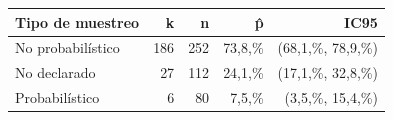 \begin{tabular}{lrrrr}
\toprule
Tipo de muestreo & k & n & p̂ & IC95\\
\midrule
No probabilístico & 186 & 252 & 73,8,\% & (68,1,\%, 78,9,\%)\\
No declarado & 27 & 112 & 24,1,\% & (17,1,\%, 32,8,\%)\\
Probabilístico & 6 & 80 & 7,5,\% & (3,5,\%, 15,4,\%)\\
\bottomrule
\end{tabular}
